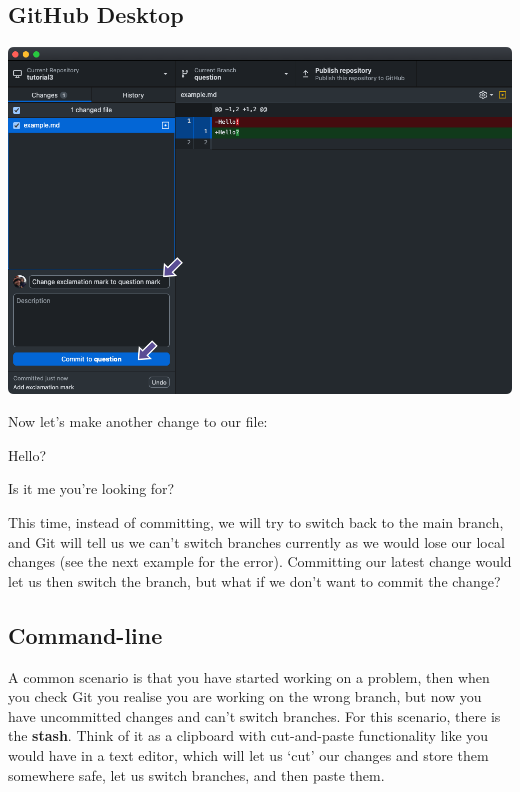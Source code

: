 \documentclass[
  letterpaper,
  DIV=11,
  numbers=noendperiod]{scrartcl}
\begin{document}
\subsection{GitHub Desktop}

\includegraphics{images/image38.png}

Now let's make another change to our file:

\begin{tcolorbox}[enhanced jigsaw, rightrule=.15mm, opacitybacktitle=0.6, bottomtitle=1mm, colbacktitle=quarto-callout-note-color!10!white, toprule=.15mm, title=\textcolor{quarto-callout-note-color}{\faInfo}\hspace{0.5em}{example.md}, toptitle=1mm, left=2mm, leftrule=.75mm, titlerule=0mm, bottomrule=.15mm, colframe=quarto-callout-note-color-frame, arc=.35mm, coltitle=black, breakable, colback=white, opacityback=0]

Hello?

Is it me you're looking for?

\end{tcolorbox}

This time, instead of committing, we will try to switch back to the main
branch, and Git will tell us we can't switch branches currently as we
would lose our local changes (see the next example for the error).
Committing our latest change would let us then switch the branch, but
what if we don't want to commit the change?

\subsection{Command-line}

A common scenario is that you have started working on a problem, then
when you check Git you realise you are working on the wrong branch, but
now you have uncommitted changes and can't switch branches. For this
scenario, there is the \textbf{stash}. Think of it as a clipboard with
cut-and-paste functionality like you would have in a text editor, which
will let us `cut' our changes and store them somewhere safe, let us
switch branches, and then paste them.
\end{document}
